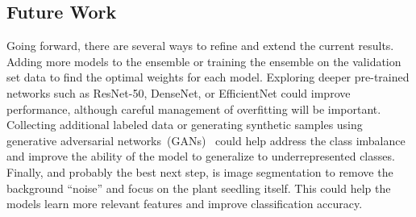 \subsection{Future Work}

Going forward, there are several ways to refine and extend the current results. Adding more models to the ensemble or training the ensemble on the validation set data to find the optimal weights for each model. Exploring deeper pre-trained networks such as ResNet-50, DenseNet, or EfficientNet could improve performance, although careful management of overfitting will be important. Collecting additional labeled data or generating synthetic samples using generative adversarial networks~(GANs)~\cite{goodfellow2014generativeadversarialnetworks} could help address the class imbalance and improve the ability of the model to generalize to underrepresented classes. Finally, and probably the best next step, is image segmentation to remove the background ``noise'' and focus on the plant seedling itself. This could help the models learn more relevant features and improve classification accuracy.